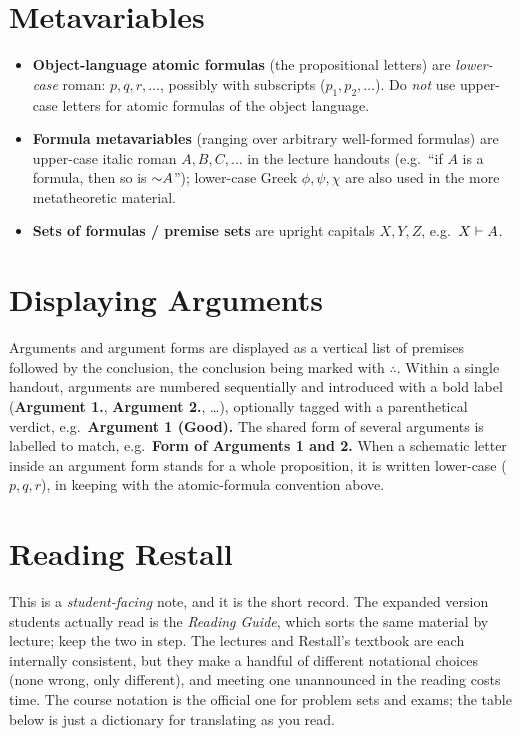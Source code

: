 \documentclass[11pt]{article}
\begin{document}
\section{Metavariables}

\begin{itemize}
  \item \textbf{Object-language atomic formulas} (the propositional
        letters) are \emph{lower-case} roman: $p, q, r, \ldots$, possibly with subscripts ($p_1, p_2, \ldots$). Do \emph{not} use upper-case letters for atomic formulas of the object language.
  \item \textbf{Formula metavariables} (ranging over arbitrary
        well-formed formulas) are upper-case italic roman $A, B, C, \ldots$ in the lecture handouts (e.g.\ ``if $A$ is a formula, then so is $\mathord{\sim} A$''); lower-case Greek $\phi, \psi, \chi$ are also used in the more metatheoretic material.
  \item \textbf{Sets of formulas / premise sets} are upright capitals
        $X, Y, Z$, e.g.\ $X \vdash A$.
\end{itemize}

\section{Displaying Arguments}

Arguments and argument forms are displayed as a vertical list of premises followed by the conclusion, the conclusion being marked with $\therefore$. Within a single handout, arguments are numbered sequentially and introduced with a bold label (\textbf{Argument 1.}, \textbf{Argument 2.}, \dots), optionally tagged with a parenthetical verdict, e.g.\ \textbf{Argument 1 (Good).} The shared form of several arguments is labelled to match, e.g.\ \textbf{Form of Arguments 1 and 2.} When a schematic letter inside an argument form stands for a whole proposition, it is written lower-case ($p, q, r$), in keeping with the atomic-formula convention above.

\section{Reading Restall}

This is a \emph{student-facing} note, and it is the short record. The expanded version students actually read is the \textit{Reading Guide}, which sorts the same material by lecture; keep the two in step. The lectures and Restall's textbook are each internally consistent, but they make a handful of different notational choices (none wrong, only different), and meeting one unannounced in the reading costs time. The course notation is the official one for problem sets and exams; the table below is just a dictionary for translating as you read.
\end{document}
